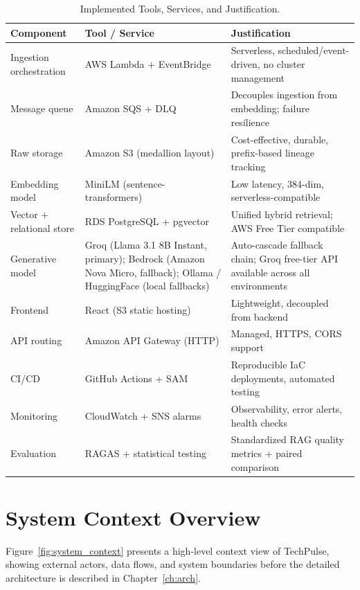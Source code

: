 \begin{table}[H]
\caption{Implemented Tools, Services, and Justification.}
\label{tab:tools}
\centering
\begin{tabular}{p{3.2cm}p{3.2cm}p{6.6cm}}
\toprule
\textbf{Component} & \textbf{Tool / Service} & \textbf{Justification} \\
\midrule
Ingestion orchestration & AWS Lambda + EventBridge & Serverless, scheduled/event-driven, no cluster management \\
Message queue & Amazon SQS + DLQ & Decouples ingestion from embedding; failure resilience \\
Raw storage & Amazon S3 (medallion layout) & Cost-effective, durable, prefix-based lineage tracking \\
Embedding model & MiniLM (sentence-transformers) & Low latency, 384-dim, serverless-compatible \\
Vector + relational store & RDS PostgreSQL + pgvector & Unified hybrid retrieval; AWS Free Tier compatible \\
Generative model & Groq (Llama 3.1 8B Instant, primary); Bedrock (Amazon Nova Micro, fallback); Ollama / HuggingFace (local fallbacks) & Auto-cascade fallback chain; Groq free-tier API available across all environments \\
Frontend & React (S3 static hosting) & Lightweight, decoupled from backend \\
API routing & Amazon API Gateway (HTTP) & Managed, HTTPS, CORS support \\
CI/CD & GitHub Actions + SAM & Reproducible IaC deployments, automated testing \\
Monitoring & CloudWatch + SNS alarms & Observability, error alerts, health checks \\
Evaluation & RAGAS + statistical testing & Standardized RAG quality metrics + paired comparison \\
\bottomrule
\end{tabular}
\end{table}

\section{System Context Overview}
\label{sec:system_context}

Figure~\ref{fig:system_context} presents a high-level context view of TechPulse, showing external actors, data flows, and system boundaries before the detailed architecture is described in Chapter~\ref{ch:arch}.


